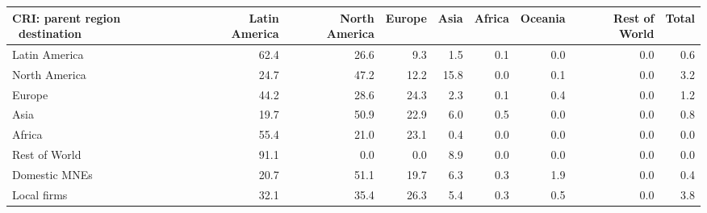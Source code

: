 \begin{tabular}{lrrrrrrrr}
\toprule
CRI: parent region \ destination & Latin America & North America & Europe & Asia & Africa & Oceania & Rest of World & Total \\
\midrule
Latin America & 62.4 & 26.6 & 9.3 & 1.5 & 0.1 & 0.0 & 0.0 & 0.6 \\
North America & 24.7 & 47.2 & 12.2 & 15.8 & 0.0 & 0.1 & 0.0 & 3.2 \\
Europe & 44.2 & 28.6 & 24.3 & 2.3 & 0.1 & 0.4 & 0.0 & 1.2 \\
Asia & 19.7 & 50.9 & 22.9 & 6.0 & 0.5 & 0.0 & 0.0 & 0.8 \\
Africa & 55.4 & 21.0 & 23.1 & 0.4 & 0.0 & 0.0 & 0.0 & 0.0 \\
Rest of World & 91.1 & 0.0 & 0.0 & 8.9 & 0.0 & 0.0 & 0.0 & 0.0 \\
Domestic MNEs & 20.7 & 51.1 & 19.7 & 6.3 & 0.3 & 1.9 & 0.0 & 0.4 \\
Local firms & 32.1 & 35.4 & 26.3 & 5.4 & 0.3 & 0.5 & 0.0 & 3.8 \\
\bottomrule
\end{tabular}
